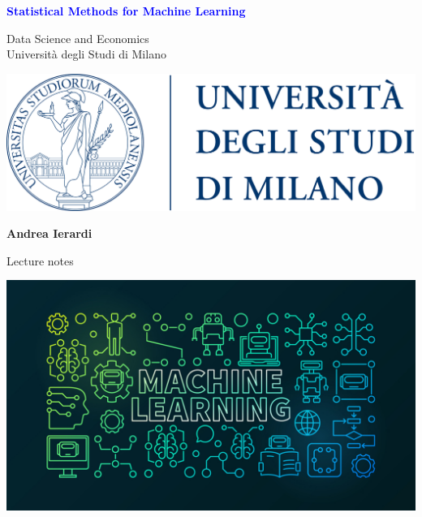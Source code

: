 \documentclass[a4paper,12pt]{report}
\newcommand\col[2]{\textcolor{#2}{#1}}
\begin{document}
\begin{titlepage}
    \begin{center}
        \vspace*{0.1cm}
            
        \Huge
        \textbf{\col{Statistical Methods for Machine Learning}{Blue}}
            
        \vspace{0.5cm}
        \LARGE
        Data Science and Economics \\
                    Università degli Studi di Milano\\
                            \vspace{0.5cm}

 \includegraphics[width=.5\linewidth]{unimi}

        \vspace{1.5cm}
            
        \textbf{Andrea Ierardi}
            
        \vfill
            
        Lecture notes
            
        \vspace{1cm}
            
 \includegraphics[width=0.9\linewidth]{front}
                        
    \end{center}
\end{titlepage}


\newpage
\tableofcontents
\listoffigures

\newpage
\end{document}
